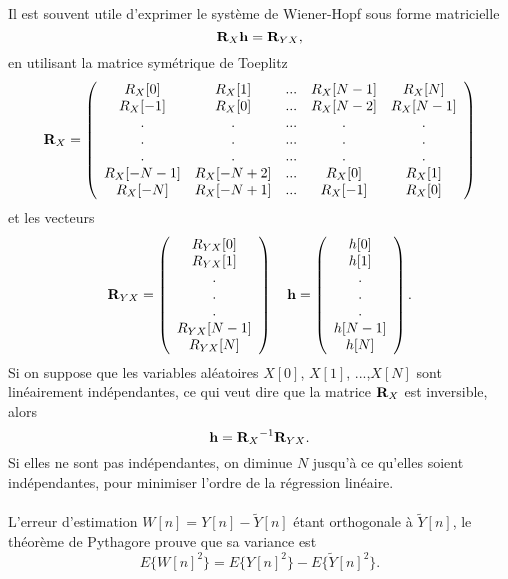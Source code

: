 Il est souvent utile d'exprimer le syst\`eme de
Wiener-Hopf sous forme matricielle 
\begin{equation}
\label{wiener-hopf}
{ {\bf R}_X} {\bf h} = {\bf R}_{YX} ,
\end{equation}
en utilisant la matrice sym\'etrique de Toeplitz
\[
{{ {\bf R}_X}} = 
\left( \begin{array}{ccccc}
R_X[0] &R_X[1] & ...&R_X[N-1] &R_X[N] \\
R_X[-1]&R_X[0]& ...&R_X[N-2]&R_X[N-1]\\
. &. &...&. &. \\
.&.&...&.&.\\
.&.&...&.&.\\
R_X[-N-1]&R_X[-N+2]&...&R_X[0]&R_X[1]\\
R_X[-N]&R_X[-N+1]&...&R_X[-1]&R_X[0]\\
\end{array}
\right)
\]
et les vecteurs
\[
{{ {\bf R}_{YX}}} = 
\left( \begin{array}{c}
R_{YX}[0] \\
R_{YX}[1] \\
. \\
. \\
. \\
R_{YX}[N-1] \\
R_{YX}[N]
\end{array}
\right)
~~~
{{ {\bf h}}} = 
\left( \begin{array}{c}
h[0] \\
h[1] \\
. \\
. \\
. \\
h[N-1] \\
h[N]
\end{array}
\right) .
\]
Si 
on suppose que les variables al\'eatoires $X[0]$, $X[1]$, ...,$X[N]$
sont lin\'eairement ind\'ependantes, ce qui veut dire que la
matrice ${ {\bf R}_X}$ est inversible, alors
\begin{equation}
\label{bh}
{\bf h} = { {\bf R}_X}^{-1} {\bf R}_{YX} .
\end{equation}
Si elles ne sont pas ind\'ependantes, on diminue $N$
jusqu'\`a ce qu'elles soient ind\'ependantes, pour minimiser l'ordre
de la r\'egression lin\'eaire.
\\
\\
L'erreur d'estimation $W [n] = Y[n] - \tilde Y[n]$
\'etant orthogonale \`a $\tilde Y[n]$, le th\'eor\`eme de Pythagore
prouve que sa variance est 
\[
E\{W [n]^2\} = E\{Y [n]^2\}  - E\{\tilde Y [n]^2\} .
\]
